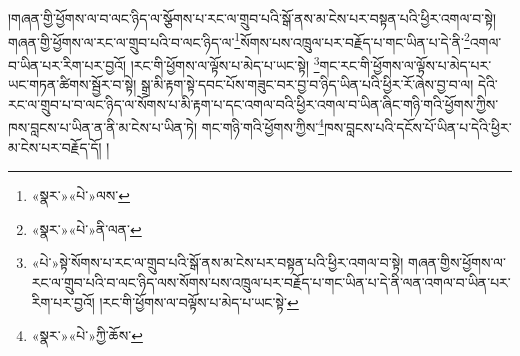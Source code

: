།གཞན་གྱི་ཕྱོགས་ལ་བ་ལང་ཉིད་ལ་སྩོགས་པ་རང་ལ་གྲུབ་པའི་སྒོ་ནས་མ་ངེས་པར་བསྟན་པའི་ཕྱིར་འགལ་བ་སྟེ། གཞན་གྱི་ཕྱོགས་ལ་རང་ལ་གྲུབ་པའི་བ་ལང་ཉིད་ལ་\footnote{«སྣར་»«པེ་»ལས་}སོགས་པས་འཁྲུལ་པར་བརྗོད་པ་གང་ཡིན་པ་དེ་ནི་\footnote{«སྣར་»«པེ་»ནི་ལན་}འགལ་བ་ཡིན་པར་རིག་པར་བྱའོ། །རང་གི་ཕྱོགས་ལ་ལྟོས་པ་མེད་པ་ཡང་སྟེ། \footnote{«པེ་»སྟེ་སོགས་པ་རང་ལ་གྲུབ་པའི་སྒོ་ནས་མ་ངེས་པར་བསྟན་པའི་ཕྱིར་འགལ་བ་སྟེ། གཞན་གྱིས་ཕྱོགས་ལ་རང་ལ་གྲུབ་པའི་བ་ལང་ཉིད་ལས་སོགས་པས་འཁྲུལ་པར་བརྗོད་པ་གང་ཡིན་པ་དེ་ནི་ལན་འགལ་བ་ཡིན་པར་རིག་པར་བྱའོ། །རང་གི་ཕྱོགས་ལ་བལྟོས་པ་མེད་པ་ཡང་སྟེ་}གང་རང་གི་ཕྱོགས་ལ་ལྟོས་པ་མེད་པར་ཡང་གཏན་ཚིགས་སྦྱོར་བ་སྟེ། སྒྲ་མི་རྟག་སྟེ་དབང་པོས་གཟུང་བར་བྱ་བ་ཉིད་ཡིན་པའི་ཕྱིར་རོ་ཞེས་བྱ་བ་ལ། དེའི་རང་ལ་གྲུབ་པ་བ་ལང་ཉིད་ལ་སོགས་པ་མི་རྟག་པ་དང་འགལ་བའི་ཕྱིར་འགལ་བ་ཡིན་ཞིང་གཉི་གའི་ཕྱོགས་ཀྱིས་ཁས་བླངས་པ་ཡིན་ན་ནི་མ་ངེས་པ་ཡིན་ཏེ། གང་གཉི་གའི་ཕྱོགས་ཀྱིས་\footnote{«སྣར་»«པེ་»ཀྱི་ཆོས་}ཁས་བླངས་པའི་དངོས་པོ་ཡིན་པ་དེའི་ཕྱིར་མ་ངེས་པར་བརྗོད་དོ། །
